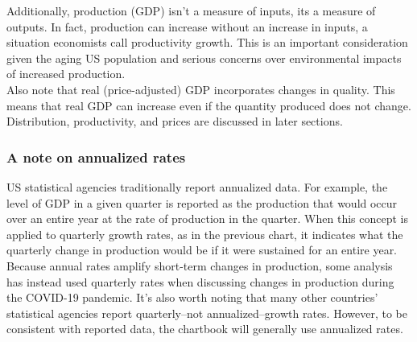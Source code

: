 \documentclass{report}
\begin{document}
\begin{minipage}{0.76\textwidth}
Additionally, production (GDP) isn't a measure of inputs, its a measure of outputs. In fact, production can increase without an increase in inputs, a situation economists call productivity growth. This is an important consideration given the aging US population and serious concerns over environmental impacts of increased production. \\

Also note that real (price-adjusted) GDP incorporates changes in quality. This means that real GDP can increase even if the quantity produced does not change. Distribution, productivity, and prices are discussed in later sections.

\subsubsection*{\color{black!70}\seriffont A note on annualized rates}
\small US statistical agencies traditionally report annualized data. For example, the level of GDP in a given quarter is reported as the production that would occur over an entire year at the rate of production in the quarter. When this concept is applied to quarterly growth rates, as in the previous chart, it indicates what the quarterly change in production would be if it were sustained for an entire year. \\

Because annual rates amplify short-term changes in production, some analysis has instead used quarterly rates when discussing changes in production during the COVID-19 pandemic. It's also worth noting that many other countries' statistical agencies report quarterly--not annualized--growth rates. However, to be consistent with reported data, the chartbook will generally use annualized rates.
\end{minipage}
\newpage
\end{document}
